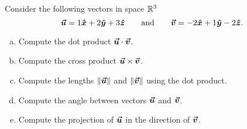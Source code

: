 \documentclass[12pt]{article} %
\begin{document}
\newpage
\begin{problem}
Consider the following vectors in space $\mathbb{R}^3$
\[
\boldsymbol{\vec{u}} = 1\boldsymbol{\hat{x}} + 2\boldsymbol{\hat{y}} + 3\boldsymbol{\hat{z}} \qquad \textrm{and} \qquad \boldsymbol{\vec{v}} = -2\boldsymbol{\hat{x}} +1\boldsymbol{\hat{y}} -2\boldsymbol{\hat{z}}.
\]
\begin{enumerate}[(a)]
    \item Compute the dot product $\boldsymbol{\vec{u}}\cdot \boldsymbol{\vec{v}}$. 
    \item Compute the cross product $\boldsymbol{\vec{u}} \times \boldsymbol{\vec{v}}$.
    \item Compute the lengths $\|\boldsymbol{\vec{u}}\|$ and $\|\boldsymbol{\vec{v}}\|$ using the dot product.
    \item Compute the angle between vectors $\boldsymbol{\vec{u}}$ and $\boldsymbol{\vec{v}}$. 
    \item Compute the projection of $\boldsymbol{\vec{u}}$ in the direction of $\boldsymbol{\vec{v}}$. 
\end{enumerate}
\end{problem}
\end{document}
